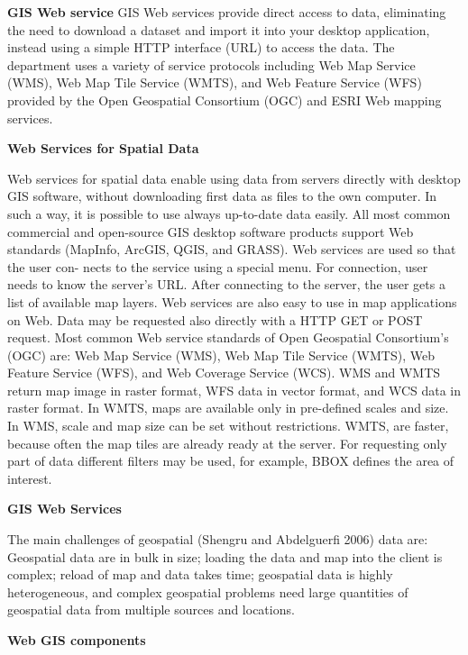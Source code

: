 \documentclass[]{book}
\begin{document}
\textbf{GIS Web service}
GIS Web services provide direct access to data, eliminating
the need to download a dataset and import it into your
desktop application, instead using a simple HTTP interface
(URL) to access the data. The department uses a variety of
service protocols including Web Map Service (WMS), Web
Map Tile Service (WMTS), and Web Feature Service (WFS) provided by the Open Geospatial Consortium
(OGC) and ESRI Web mapping services.

\textbf{Web Services for Spatial Data}

Web services for spatial data enable using data from servers
directly with desktop GIS software, without downloading
first data as files to the own computer. In such a way, it is
possible to use always up-to-date data easily. All most
common commercial and open-source GIS desktop software
products support Web standards (MapInfo, ArcGIS, QGIS,
and GRASS). Web services are used so that the user con-
nects to the service using a special menu. For connection,
user needs to know the server's URL. After connecting to
the server, the user gets a list of available map layers. Web
services are also easy to use in map applications on Web.
Data may be requested also directly with a HTTP GET or
POST request.
Most common Web service standards of Open Geospatial
Consortium's (OGC) are: Web Map Service (WMS), Web
Map Tile Service (WMTS), Web Feature Service (WFS),
and Web Coverage Service (WCS).
WMS and WMTS return map image in raster format,
WFS data in vector format, and WCS data in raster format.
In WMTS, maps are available only in pre-defined scales and
size. In WMS, scale and map size can be set without
restrictions. WMTS, are faster, because often the map tiles
are already ready at the server. For requesting only part of
data different filters may be used, for example, BBOX
defines the area of interest.

\textbf{GIS Web Services}

The main challenges of geospatial (Shengru and Abdelguerfi
2006) data are:
Geospatial data are in bulk in size; loading the data and map
into the client is complex; reload of map and data takes time;
geospatial data is highly heterogeneous, and complex
geospatial problems need large quantities of geospatial data
from multiple sources and locations.

\textbf{Web GIS components}
\end{document}
